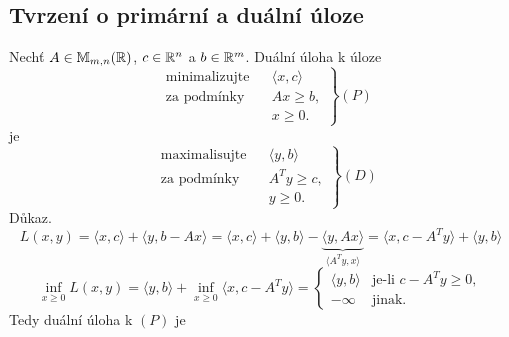 \subsection{Tvrzení o primární a duální úloze}
Nechť $A \in \mathbb{M}_{m,n}(\mathbb{R})$, $c \in \mathbb{R}^n$ a $b \in \mathbb{R}^m$. Duální úloha k úloze
\[
    \left.
    \begin{aligned}
        &\text{minimalizujte}&& \langle x, c \rangle \\
        &\text{za podmínky}  && Ax \geq b, \\
        &                    && x \geq 0.
    \end{aligned}
    \right\} (P)
\]
je
\[
    \left.\begin{aligned}
        &\text{maximalisujte}&& \langle y,b \rangle \\
        &\text{za podmínky}  && A^Ty \geq c, \\
        &                    && y \geq 0.
    \end{aligned}
    \right\} (D)
\]
Důkaz. 
\[
    L(x, y) = \langle x, c\rangle + \langle y, b- Ax\rangle = \langle x, c\rangle + \langle y, b\rangle - 
    \underbrace{\langle y, Ax\rangle}_{\langle A^Ty, x\rangle} = \langle x, c-A^Ty\rangle + \langle y, b\rangle
\]
\[
    \inf_{x\geq 0} L(x, y) = \langle y, b\rangle + \inf_{x\geq 0} \langle x, c-A^Ty\rangle =
    \begin{cases}
        \langle y, b\rangle & \text{je-li } c-A^Ty \geq 0, \\
        - \infty & \text{jinak.}
    \end{cases}
\]
Tedy duální úloha k $(P)$ je

